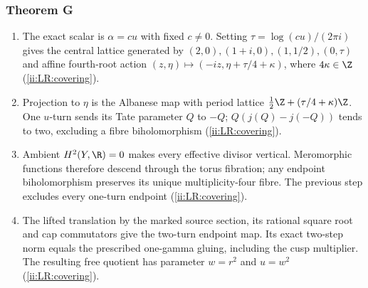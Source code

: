 \hypertarget{outline-II-G}{}
\subsubsection*{Theorem G}
\begin{enumerate}[label=\arabic*.,leftmargin=*]
\item\hypertarget{step-II-G-1}{} The exact scalar is $\alpha=cu$
with fixed $c\ne0$. Setting $\tau=\log(cu)/(2\pi i)$ gives
the central lattice generated by $(2,0),(1+i,0),(1,1/2),(0,\tau)$
and affine fourth-root action
$(z,\eta)\mapsto(-iz,\eta+\tau/4+\kappa)$, where
$4\kappa\in\Z$ (\hyperref[ii:LR:covering]{\ref*{ii:LR:covering}}).
\item\hypertarget{step-II-G-2}{} Projection to $\eta$ is the
Albanese map with period lattice
$\tfrac12\Z+(\tau/4+\kappa)\Z$. One $u$-turn sends its
Tate parameter $Q$ to $-Q$; $Q(j(Q)-j(-Q))$ tends to two,
excluding a fibre biholomorphism
(\hyperref[ii:LR:covering]{\ref*{ii:LR:covering}}).
\item\hypertarget{step-II-G-3}{} Ambient $H^2(Y,\R)=0$ makes
every effective divisor vertical. Meromorphic functions therefore
descend through the torus fibration; any endpoint biholomorphism
preserves its unique multiplicity-four fibre. The previous step
excludes every one-turn endpoint
(\hyperref[ii:LR:covering]{\ref*{ii:LR:covering}}).
\item\hypertarget{step-II-G-4}{} The lifted translation by the
marked source section, its rational square root and cap
commutators give the two-turn endpoint map. Its exact two-step
norm equals the prescribed one-gamma gluing, including the cusp
multiplier. The resulting free quotient has parameter
$w=r^2$ and $u=w^2$
(\hyperref[ii:LR:covering]{\ref*{ii:LR:covering}}).
\end{enumerate}

